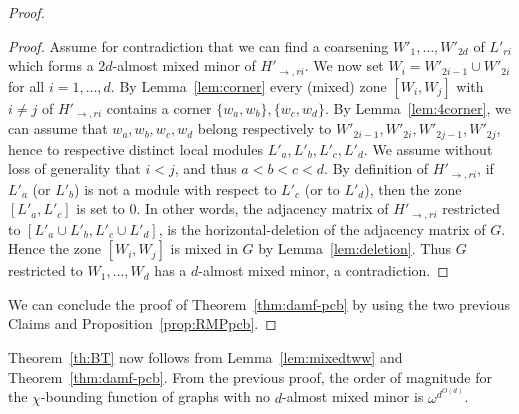 \begin{proof}
\begin{proof}
    Assume for contradiction that we can find a coarsening $W'_1,\dots ,W'_{2d}$ of $L'_{ri}$ which forms a $2d$-almost mixed minor of $H'_{\rightarrow,ri}$. We now set $W_i=W'_{2i-1}\cup W'_{2i}$ for all $i=1,\dots ,d$. 
    By Lemma~\ref{lem:corner} every (mixed) zone $[W_i,W_j]$ with $i\neq j$ of $H'_{\rightarrow,ri}$ contains a corner $\{w_a,w_b\},\{w_c,w_d\}$.  By Lemma~\ref{lem:4corner}, we can assume that $w_a,w_b,w_c,w_d$ belong respectively to $W'_{2i-1},W'_{2i},W'_{2j-1},W'_{2j}$, hence to respective distinct local modules $L'_a,L'_b,L'_c,L'_d$.
    We assume without loss of generality that $i<j$, and thus $a<b<c<d$. 
    By definition of $H'_{\rightarrow,ri}$, if $L'_a$ (or $L'_b$) is not a module with respect to $L'_c$ (or to $L'_d$), then the zone $[L'_a,L'_c]$ is set to 0. In other words, the adjacency matrix of $H'_{\rightarrow,ri}$ restricted to $[L'_a\cup L'_b,L'_c\cup L'_d]$, is the horizontal-deletion of the adjacency matrix of $G$. Hence the zone $[W_i,W_j]$ is mixed in $G$ by Lemma~\ref{lem:deletion}. Thus $G$ restricted to $W_1,\dots ,W_d$ has a $d$-almost mixed minor, a contradiction.
\end{proof}
We can conclude the proof of Theorem~\ref{thm:damf-pcb} by using the two previous Claims and Proposition~\ref{prop:RMPpcb}.
\end{proof}

Theorem~\ref{th:BT} now follows from Lemma~\ref{lem:mixedtww} and Theorem~\ref{thm:damf-pcb}. From the previous proof, the order of magnitude for the $\chi$-bounding function of graphs with no $d$-almost mixed minor is $\omega^{d^{O(d)}}$.